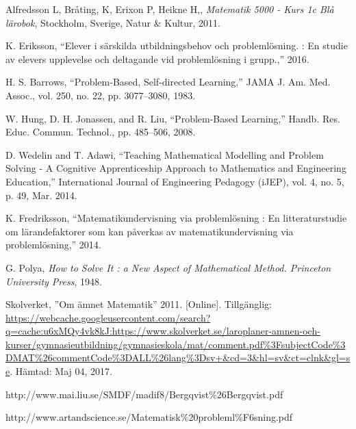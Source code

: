     Alfredsson L, Bråting, K, Erixon P, Heikne H,, \textit{Matematik 5000 - Kurs 1c Blå lärobok}, Stockholm, Sverige, Natur \& Kultur, 2011.
     
    K. Eriksson, “Elever i särskilda utbildningsbehov och problemlösning. : En studie av elevers upplevelse och deltagande vid problemlösning i grupp.,” 2016.
     
     H. S. Barrows, “Problem-Based, Self-directed Learning,” JAMA J. Am. Med. Assoc., vol. 250, no. 22, pp. 3077–3080, 1983.
      
    W. Hung, D. H. Jonassen, and R. Liu, “Problem-Based Learning,” Handb. Res. Educ. Commun. Technol., pp. 485–506, 2008.
    
    D. Wedelin and T. Adawi, “Teaching Mathematical Modelling and Problem Solving - A Cognitive Apprenticeship Approach to Mathematics and Engineering Education,” International Journal of Engineering Pedagogy (iJEP), vol. 4, no. 5, p. 49, Mar. 2014.
    
    K. Fredriksson, “Matematikundervisning via problemlösning : En litteraturstudie om lärandefaktorer som kan påverkas av matematikundervisning via problemlösning,” 2014.
    
    G. Polya, \textsl{How to Solve It : a New Aspect of Mathematical Method. Princeton University Press}, 1948.
    
    Skolverket, ''Om ämnet Matematik'' 2011. [Online]. Tillgänglig: 
    \url{https://webcache.googleusercontent.com/search?q=cache:u6xMQy4vk8kJ:https://www.skolverket.se/laroplaner-amnen-och-kurser/gymnasieutbildning/gymnasieskola/mat/comment.pdf\%3FsubjectCode\%3DMAT\%26commentCode\%3DALL\%26lang\%3Dsv+&cd=3&hl=sv&ct=clnk&gl=se}. Hämtad: Maj 04, 2017.
    
    http://www.mai.liu.se/SMDF/madif8/Bergqvist\%26Bergqvist.pdf
    
    http://www.artandscience.se/Matematisk\%20probleml\%F6sning.pdf